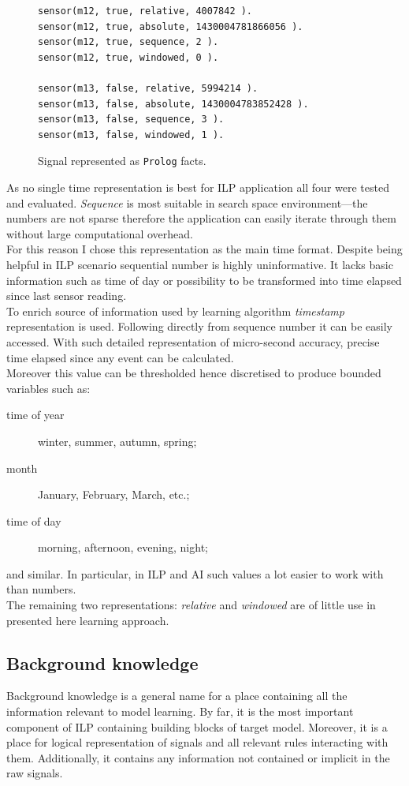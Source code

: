\documentclass[11pt, a4paper, pdflatex, leqno, twoside, openright]{report}
\begin{document}
\begin{figure}[htb] %
  \begin{verbatim}
sensor(m12, true, relative, 4007842 ).
sensor(m12, true, absolute, 1430004781866056 ).
sensor(m12, true, sequence, 2 ).
sensor(m12, true, windowed, 0 ).

sensor(m13, false, relative, 5994214 ).
sensor(m13, false, absolute, 1430004783852428 ).
sensor(m13, false, sequence, 3 ).
sensor(m13, false, windowed, 1 ).
  \end{verbatim}
  \caption{Signal represented as \texttt{Prolog} facts.\label{lst:timerepresentation}}
\end{figure}

As no single time representation is best for ILP application all four were tested and evaluated. \emph{Sequence} is most suitable in search space environment---the numbers are not sparse therefore the application can easily iterate through them without large computational overhead.\\
For this reason I chose this representation as the main time format. Despite being helpful in ILP scenario sequential number is highly uninformative. It lacks basic information such as time of day or possibility to be transformed into time elapsed since last sensor reading.\\

To enrich source of information used by learning algorithm \emph{timestamp} representation is used. Following directly from sequence number it can be easily accessed. With such detailed representation of micro-second accuracy, precise time elapsed since any event can be calculated.\\
Moreover this value can be thresholded hence discretised to produce bounded variables such as:
\begin{description}
\item[time of year] winter, summer, autumn, spring;
\item[month] January, February, March, etc.;
\item[time of day] morning, afternoon, evening, night;
\end{description}
and similar. In particular, in ILP and AI such values a lot easier to work with than numbers.\\

The remaining two representations: \emph{relative} and \emph{windowed} are of little use in presented here learning approach.

    \subsection{Background knowledge\label{sec:data:bkg}}
Background knowledge is a general name for a place containing all the information relevant to model learning. By far, it is the most important component of ILP containing building blocks of target model. Moreover, it is a place for logical representation of signals and all relevant rules interacting with them. Additionally, it contains any information not contained or implicit in the raw signals.\\
\end{document}
